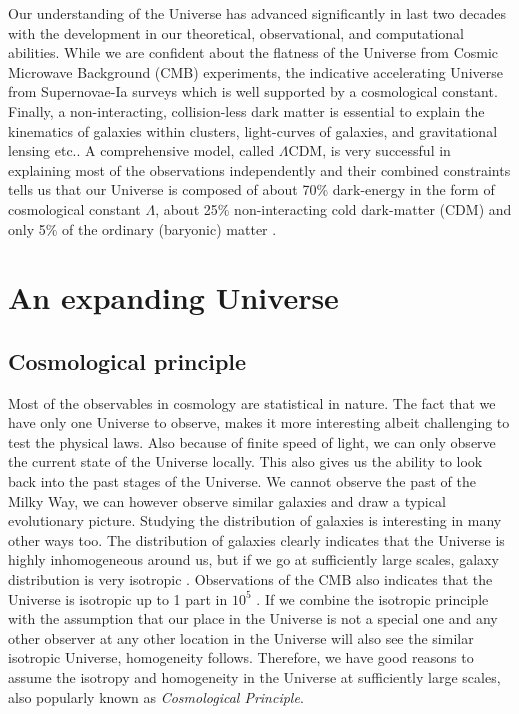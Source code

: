 \documentclass[
  11pt,
  twoside,
  openright,
  titlepage,
  headings=optiontoheadandtoc
]{scrbook}
\begin{document}
Our understanding of the Universe has advanced significantly in 
last two decades with the development in our 
theoretical, observational, and computational abilities. 
While we are confident about the flatness of the Universe from Cosmic Microwave 
Background (CMB) experiments, 
the indicative accelerating Universe from Supernovae-Ia surveys which is well supported
by a cosmological constant. Finally, a non-interacting, collision-less dark matter is essential 
to explain the kinematics of galaxies within clusters, light-curves of galaxies, and 
gravitational lensing etc.. A comprehensive model, called $\Lambda$CDM,
is very successful in explaining most of the observations independently and their
combined constraints tells us that our Universe is composed of about 70$\%$
dark-energy in the form of cosmological constant $\Lambda$, about 25$\%$ non-interacting
cold dark-matter (CDM) and only 5$\%$ of the ordinary (baryonic) matter 
\citep{2015arXiv150201589P}. 


\section{An expanding Universe}

\subsection{Cosmological principle}

Most of the observables in cosmology are statistical in nature. 
The fact that we have only one Universe to observe,
makes it more interesting albeit challenging to test the physical laws. Also because 
of finite speed of light, we can only observe the current state of the Universe locally. 
This also gives us the ability to look back into the past stages of the Universe. 
We cannot observe the past of the Milky Way, we can however observe similar
galaxies and draw a typical evolutionary picture. Studying the distribution of 
galaxies is interesting in many other ways too. 
The distribution of galaxies clearly indicates that the Universe is highly 
inhomogeneous around us, but if we go at sufficiently large scales, 
galaxy distribution is very isotropic \citep{2012ApJS..203...21A,2015arXiv150100963A}.
Observations of the CMB also indicates 
that the Universe is isotropic up to 1 part in $10^{5}$ \citep{2011A&A...536A..19P}. 
If we combine the isotropic principle with the 
assumption that our place in the Universe is not a special one and any other observer
at any other location in the Universe will also see the similar isotropic Universe,
homogeneity follows. Therefore, we have good reasons to assume the isotropy 
and homogeneity in the Universe at sufficiently large scales, also popularly
known as {\it Cosmological Principle}.
\end{document}
